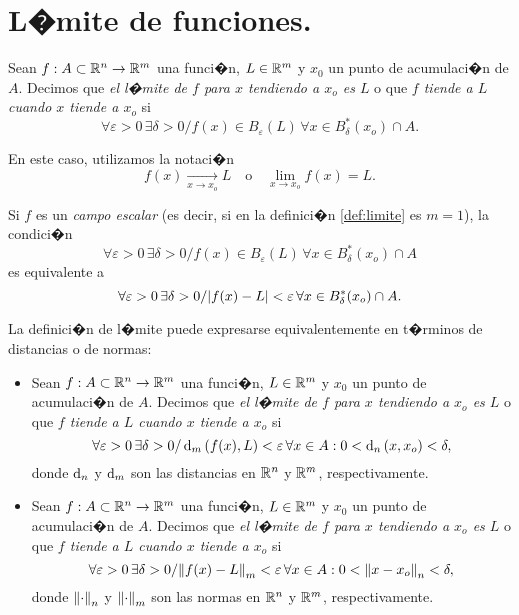 \documentclass[a4paper]{scrartcl} %
\begin{document}
\section{L�mite de funciones.} \label{sec:limites}
\begin{definition} [L�mite] \label{def:limite}
Sean $f:A \subset \mathbb{R}^n \to \mathbb{R}^m$ una funci�n, $L \in \mathbb{R}^m$ y $x_0$ un punto de acumulaci�n de $A$. Decimos que \emph{el l�mite de $f$ para $x$ tendiendo a $x_o$ es $L$} o que \emph{$f$ tiende a $L$ cuando $x$ tiende a $x_o$}
si
\[
 \forall \varepsilon > 0 \, \exists \delta > 0 / f(x) \in B_{\varepsilon}(L) \, \forall 
 x \in B_{\delta}^*(x_o) \cap A.
\]

En este caso, utilizamos la notaci�n
\[
 f(x) \xrightarrow[x \to x_o]{} L \quad \text{o} \quad \lim_{x \to x_o} f(x) = L.
\]
\begin{obs} Si $f$ es un \emph{campo escalar} (es decir, si en la definici�n \eqref{def:limite} es $m = 1$), la condici�n 
 \[
 \forall \varepsilon > 0 \, \exists \delta > 0 / f(x) \in B_{\varepsilon}(L) \, \forall 
 x \in B_{\delta}^*(x_o) \cap A
\]
es equivalente a 
\[
 \forall \varepsilon > 0 \, \exists \delta > 0 / \abs{ f(x) - L } < \varepsilon \, \forall 
 x \in B_{\delta}^*(x_o) \cap A.
\]
\end{obs}

\begin{obs} La definici�n de l�mite puede expresarse equivalentemente en t�rminos de distancias o de normas:
\begin{itemize} 
 \item Sean $f:A \subset \mathbb{R}^n \to \mathbb{R}^m$ una funci�n, $L \in \mathbb{R}^m$ y $x_0$ un punto de acumulaci�n de $A$. Decimos que \emph{el l�mite de $f$ para $x$ tendiendo a $x_o$ es $L$} o que \emph{$f$ tiende a $L$ cuando $x$ tiende a $x_o$} si
\[
 \forall \varepsilon > 0 \, \exists \delta > 0 / \operatorname{d}_m {(f(x),L)} < \varepsilon \, \forall 
 x\in A : 0 < \operatorname{d}_n {(x,x_o)} < \delta,
\] 
donde $\operatorname{d}_n$ y $\operatorname{d}_m$ son las distancias en $\mathbb{R}^n$ y $\mathbb{R}^m$, respectivamente.

 \item Sean $f:A \subset \mathbb{R}^n \to \mathbb{R}^m$ una funci�n, $L \in \mathbb{R}^m$ y $x_0$ un punto de acumulaci�n de $A$. Decimos que \emph{el l�mite de $f$ para $x$ tendiendo a $x_o$ es $L$} o que \emph{$f$ tiende a $L$ cuando $x$ tiende a $x_o$} si
\[
 \forall \varepsilon > 0 \, \exists \delta > 0 / \norm{f(x) - L}_m < \varepsilon \, \forall 
 x\in A : 0 < \norm{x - x_o}_n < \delta,
\] 
donde $\norm{\cdot}_n$ y $\norm{\cdot}_m$ son las normas en $\mathbb{R}^n$ y $\mathbb{R}^m$, respectivamente.
\end{itemize}
\end{obs}

\end{definition}
\end{document}
